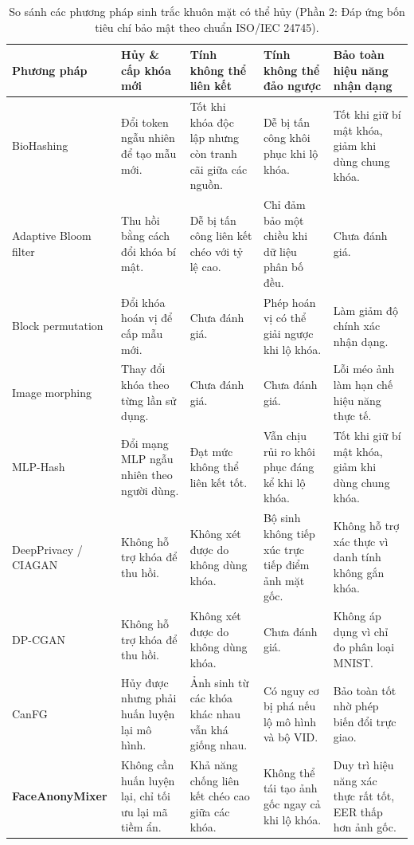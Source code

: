 \documentclass[oneside,a4paper,12pt]{extarticle}
\begin{document}
\begin{table}[H]
\centering
\caption[So sánh các phương pháp CFB (Phần 2: Đáp ứng chuẩn ISO/IEC 24745)]{So sánh các phương pháp sinh trắc khuôn mặt có thể hủy (Phần 2: Đáp ứng bốn tiêu chí bảo mật theo chuẩn ISO/IEC 24745).}
\label{tab:cfb-comparison-iso}
\begin{spacing}{1.08}
\footnotesize
\setlength{\tabcolsep}{4pt}
\begin{tabular}{@{}P{3.1cm}P{2.7cm}P{3.0cm}P{2.8cm}P{3.0cm}@{}}
\toprule
\textbf{Phương pháp} & \textbf{Hủy \& cấp khóa mới} & \textbf{Tính không thể liên kết} & \textbf{Tính không thể đảo ngược} & \textbf{Bảo toàn hiệu năng nhận dạng} \\
\midrule
BioHashing \cite{teoh2006} & Đổi token ngẫu nhiên để tạo mẫu mới. & Tốt khi khóa độc lập nhưng còn tranh cãi giữa các nguồn. & Dễ bị tấn công khôi phục khi lộ khóa. & Tốt khi giữ bí mật khóa, giảm khi dùng chung khóa. \\
\addlinespace[4pt]
Adaptive Bloom filter \cite{rathgeb2013} & Thu hồi bằng cách đổi khóa bí mật. & Dễ bị tấn công liên kết chéo với tỷ lệ cao. & Chỉ đảm bảo một chiều khi dữ liệu phân bố đều. & Chưa đánh giá. \\
\addlinespace[4pt]
Block permutation \cite{ratha2001} & Đổi khóa hoán vị để cấp mẫu mới. & Chưa đánh giá. & Phép hoán vị có thể giải ngược khi lộ khóa. & Làm giảm độ chính xác nhận dạng. \\
\addlinespace[4pt]
Image morphing \cite{ghafourian2023} & Thay đổi khóa theo từng lần sử dụng. & Chưa đánh giá. & Chưa đánh giá. & Lỗi méo ảnh làm hạn chế hiệu năng thực tế. \\
\addlinespace[4pt]
MLP-Hash \cite{shahreza2023mlp} & Đổi mạng MLP ngẫu nhiên theo người dùng. & Đạt mức không thể liên kết tốt. & Vẫn chịu rủi ro khôi phục đáng kể khi lộ khóa. & Tốt khi giữ bí mật khóa, giảm khi dùng chung khóa. \\
\addlinespace[4pt]
DeepPrivacy \cite{hukkelas2019} / CIAGAN \cite{maximov2020} & Không hỗ trợ khóa để thu hồi. & Không xét được do không dùng khóa. & Bộ sinh không tiếp xúc trực tiếp điểm ảnh mặt gốc. & Không hỗ trợ xác thực vì danh tính không gắn khóa. \\
\addlinespace[4pt]
DP-CGAN \cite{torkz2019} & Không hỗ trợ khóa để thu hồi. & Không xét được do không dùng khóa. & Chưa đánh giá. & Không áp dụng vì chỉ đo phân loại MNIST. \\
\addlinespace[4pt]
CanFG \cite{wang2024canfg} & Hủy được nhưng phải huấn luyện lại mô hình. & Ảnh sinh từ các khóa khác nhau vẫn khá giống nhau. & Có nguy cơ bị phá nếu lộ mô hình và bộ VID. & Bảo toàn tốt nhờ phép biến đổi trực giao. \\
\midrule
\textbf{FaceAnonyMixer} \cite{alam2025} & Không cần huấn luyện lại, chỉ tối ưu lại mã tiềm ẩn. & Khả năng chống liên kết chéo cao giữa các khóa. & Không thể tái tạo ảnh gốc ngay cả khi lộ khóa. & Duy trì hiệu năng xác thực rất tốt, EER thấp hơn ảnh gốc. \\
\bottomrule
\end{tabular}
\end{spacing}
\end{table}
\end{document}
